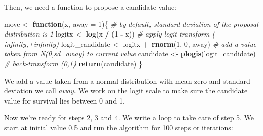 \documentclass[
  12pt,
]{krantz}
\newenvironment{Shaded}{\begin{snugshade}}{\end{snugshade}}
\newcommand{\AttributeTok}[1]{\textcolor[rgb]{0.13,0.29,0.53}{#1}}
\newcommand{\CommentTok}[1]{\textcolor[rgb]{0.56,0.35,0.01}{\textit{#1}}}
\newcommand{\ControlFlowTok}[1]{\textcolor[rgb]{0.13,0.29,0.53}{\textbf{#1}}}
\newcommand{\DecValTok}[1]{\textcolor[rgb]{0.00,0.00,0.81}{#1}}
\newcommand{\FunctionTok}[1]{\textcolor[rgb]{0.13,0.29,0.53}{\textbf{#1}}}
\newcommand{\NormalTok}[1]{#1}
\newcommand{\OtherTok}[1]{\textcolor[rgb]{0.56,0.35,0.01}{#1}}
\newcommand{\SpecialCharTok}[1]{\textcolor[rgb]{0.81,0.36,0.00}{\textbf{#1}}}
\begin{document}
Then, we need a function to propose a candidate value:

\begin{Shaded}
\begin{Highlighting}[]
\NormalTok{move }\OtherTok{\textless{}{-}} \ControlFlowTok{function}\NormalTok{(x, }\AttributeTok{away =} \DecValTok{1}\NormalTok{)\{ }\CommentTok{\# by default, standard deviation of the proposal distribution is 1}
\NormalTok{  logitx }\OtherTok{\textless{}{-}} \FunctionTok{log}\NormalTok{(x }\SpecialCharTok{/}\NormalTok{ (}\DecValTok{1} \SpecialCharTok{{-}}\NormalTok{ x)) }\CommentTok{\# apply logit transform ({-}infinity,+infinity)}
\NormalTok{  logit\_candidate }\OtherTok{\textless{}{-}}\NormalTok{ logitx }\SpecialCharTok{+} \FunctionTok{rnorm}\NormalTok{(}\DecValTok{1}\NormalTok{, }\DecValTok{0}\NormalTok{, away) }\CommentTok{\# add a value taken from N(0,sd=away) to current value}
\NormalTok{  candidate }\OtherTok{\textless{}{-}} \FunctionTok{plogis}\NormalTok{(logit\_candidate) }\CommentTok{\# back{-}transform (0,1)}
  \FunctionTok{return}\NormalTok{(candidate)}
\NormalTok{\}}
\end{Highlighting}
\end{Shaded}

We add a value taken from a normal distribution with mean zero and standard deviation we call \emph{away}. We work on the logit scale to make sure the candidate value for survival lies between 0 and 1.

Now we're ready for steps 2, 3 and 4. We write a loop to take care of step 5. We start at initial value 0.5 and run the algorithm for 100 steps or iterations:
\end{document}
